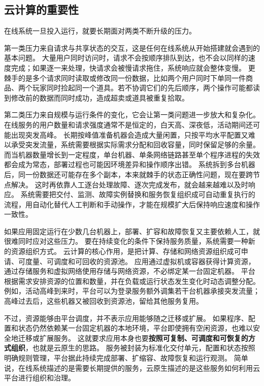 \subsection{云计算的重要性}\label{sec1:why-cloud}

在线系统一旦投入运行，就要长期面对两类不断升级的压力。

第一类压力来自请求与共享状态的交互，这是任何在线系统从开始搭建就会遇到的基本问题。
大量用户同时访问时，请求不会按顺序排队到达，也不会以同样的速度完成；如果逐一来处理，快请求会被慢请求拖住，系统响应就会整体变慢。
更棘手的是多个请求同时读取或修改同一份数据，比如两个用户同时下单同一件商品、两个玩家同时捡起同一个道具。若不协调它们的先后顺序，两个操作可能都读到修改前的数据而同时成功，造成超卖或道具被重复拾取。

第二类压力来自规模与运行条件的变化，它会让第一类问题进一步放大和复杂化。
在线服务的用户数量和请求强度通常不是恒定的，白天高、深夜低，活动期间还可能出现突发高峰。
长期按峰值准备机器会造成大量闲置，只按平均水平配置又难以承受突发流量，系统需要根据实际需求分配和回收容量，同时保留足够的余量。
而当机器数量增长到一定程度，单台机器、单条网络链路甚至单个程序进程的失效都会成为常态，部署过程也可能因环境差异和操作顺序出错。
系统拆到多台机器后，同一份数据还可能存在多个副本，本来就棘手的状态正确性问题，现在要跨节点解决。
这时再依靠人工逐台处理故障、逐次完成发布，就会越来越难以及时响应。
系统需要把交付、监测、故障实例替换和服务恢复组织成可自动重复执行的流程，用自动化替代人工判断和手动操作，才能在规模扩大后保持响应速度和操作一致性。

如果应用固定运行在少数几台机器上，部署、扩容和故障恢复又主要依赖人工，就很难同时应对这些压力。
要在持续变化的条件下保持服务质量，系统需要一种新的资源组织方式。
云计算的核心作用，是把计算、存储和网络资源组织成可申请、可度量、可调度和可回收的资源池。
应用通过虚拟机或容器获得计算资源，通过存储服务和虚拟网络使用存储与网络资源，不必绑定某一台固定机器。
平台根据需求安排资源的位置和数量，并在负载或运行状态发生变化时动态调整分配。
例如，活动高峰到来时，平台可以为登录服务额外调集若干台机器承接突发流量；高峰过去后，这些机器又被回收到资源池，留给其他服务复用。

不过，资源能够由平台调度，并不表示应用能够随之迁移或扩展。
如果程序、配置和状态仍然依赖某一台固定机器的本地环境，平台即使拥有空闲资源，也难以安全地迁移或扩展服务。
这就要求应用本身也要\textbf{按照可复制、可调度和可恢复的方式组织}，也就是云原生的思路。
服务被封装为标准化交付单元，配置和状态按照明确规则管理，平台据此持续完成部署、扩缩容、故障恢复和运行观测。
简单说，在线系统描述的是需要长期提供的服务，云原生描述的是这些服务如何利用云平台进行组织和治理。

